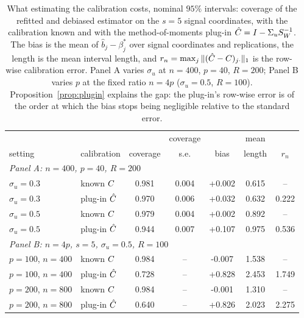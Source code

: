 \begin{table}[ht]
\centering
\scriptsize
\setlength{\tabcolsep}{5pt}
\caption{What estimating the calibration costs, nominal $95\%$ intervals: coverage of the refitted and debiased estimator on the $s=5$ signal coordinates, with the calibration known and with the method-of-moments plug-in $\hat{C}=I-\Sigma_uS_W^{-1}$. The bias is the mean of $\hat b_j-\beta^*_j$ over signal coordinates and replications, the length is the mean interval length, and $r_n=\max_j\|(\hat{C}-C)_{j\cdot}\|_1$ is the row-wise calibration error. Panel A varies $\sigma_u$ at $n=400$, $p=40$, $R=200$; Panel B varies $p$ at the fixed ratio $n=4p$ ($\sigma_u=0.5$, $R=100$). Proposition~\ref{prop:plugin} explains the gap: the plug-in's row-wise error is of the order at which the bias stops being negligible relative to the standard error.}
\label{tab:plugin}
\begin{tabular}{llccccc}
\toprule
& & & coverage & & mean & \\
setting & calibration & coverage & s.e. & bias & length & $r_n$ \\
\midrule
\multicolumn{7}{l}{\emph{Panel A: $n=400$, $p=40$, $R=200$}}\\
$\sigma_u=0.3$ & known $C$ & 0.981 & 0.004 & +0.002 & 0.615 & -- \\
$\sigma_u=0.3$ & plug-in $\hat{C}$ & 0.970 & 0.006 & +0.032 & 0.632 & 0.222 \\
$\sigma_u=0.5$ & known $C$ & 0.979 & 0.004 & +0.002 & 0.892 & -- \\
$\sigma_u=0.5$ & plug-in $\hat{C}$ & 0.944 & 0.007 & +0.107 & 0.975 & 0.536 \\
\midrule
\multicolumn{7}{l}{\emph{Panel B: $n=4p$, $s=5$, $\sigma_u=0.5$, $R=100$}}\\
$p=100$, $n=400$ & known $C$ & 0.984 & -- & -0.007 & 1.538 & -- \\
$p=100$, $n=400$ & plug-in $\hat{C}$ & 0.728 & -- & +0.828 & 2.453 & 1.749 \\
$p=200$, $n=800$ & known $C$ & 0.984 & -- & -0.001 & 1.310 & -- \\
$p=200$, $n=800$ & plug-in $\hat{C}$ & 0.640 & -- & +0.826 & 2.023 & 2.275 \\
\bottomrule
\end{tabular}
\end{table}
